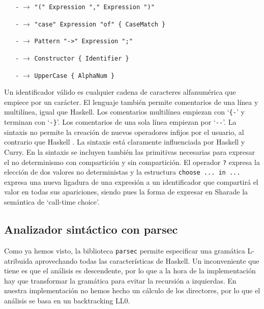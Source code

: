 \documentclass[class=article, crop=false]{standalone}
\begin{document}
\begin{itemize}
  \item[-]{} $\rightarrow$
  \verb`"(" Expression "," Expression ")"`
  
  \item[-]{} $\rightarrow$
  \verb`"case" Expression "of" { CaseMatch }`
  
  \item[-]{} $\rightarrow$ \verb`Pattern "->" Expression ";"`
  \item[-]{} $\rightarrow$ \verb`Constructor { Identifier }`
  \item[-]{} $\rightarrow$ \verb`UpperCase { AlphaNum }`
\end{itemize}

Un identificador válido es cualquier cadena de caracteres alfanumérica que empiece por un
carácter. El lenguaje también permite comentarios de una línea y multilínea, igual que
Haskell. Los comentarios multilínea empiezan con `\verb`{-`' y terminan con `\verb`-}`'. Los
comentarios de una sola línea empiezan por `\verb`--`'. La sintaxis no permite la creación de
nuevos operadores infijos por el usuario, al contrario que Haskell \cite{marlow2010haskell}.
La sintaxis está claramente influenciada por Haskell y Curry. En la sintaxis se incluyen
también las primitivas necesarias para expresar el no determinismo con compartición y sin
compartición. El operador \verb`?` expresa la elección de dos valores no deterministas y la
estructura \verb`choose ... in ...` expresa una nueva ligadura de una expresión a un
identificador que compartirá el valor en todas sus apariciones, siendo pues la forma de
expresar en Sharade la semántica de `call-time choice'.

\subsection{Analizador sintáctico con parsec}\label{sec:analizador_sintactico}

Como ya hemos visto, la biblioteca \verb`parsec` permite especificar una gramática
L-atribuida aprovechando todas las características de Haskell. Un inconveniente que tiene es
que el análisis es descendente, por lo que a la hora de la implementación hay que transformar
la gramática para evitar la recursión a izquierdas. En nuestra implementación no hemos hecho
un cálculo de los directores, por lo que el análisis se basa en un backtracking LL0.
\end{document}
